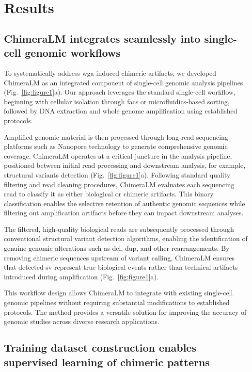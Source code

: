 \documentclass[pdflatex,sn-nature]{sn-jnl}%
\theoremstyle{thmstyleone}%
\theoremstyle{thmstyletwo}%
\theoremstyle{thmstylethree}%
\begin{document}
\section*{Results}\label{sec:results}

\subsection*{ChimeraLM integrates seamlessly into single-cell genomic workflows}

To systematically address \gls{wga}-induced chimeric artifacts, we developed ChimeraLM as an integrated component of single-cell genomic analysis pipelines (Fig.~\ref{fig:figure1}a).
Our approach leverages the standard single-cell workflow, beginning with cellular isolation through \gls{facs} or microfluidics-based sorting, followed by DNA extraction and whole genome amplification using established protocols.

Amplified genomic material is then processed through long-read sequencing platforms such as Nanopore technology to generate comprehensive genomic coverage.
ChimeraLM operates at a critical juncture in the analysis pipeline, positioned between initial read processing and downstream analysis, for example, structural variants detection (Fig.~\ref{fig:figure1}a).
Following standard quality filtering and read cleaning procedures, ChimeraLM evaluates each sequencing read to classify it as either biological or chimeric artifacts.
This binary classification enables the selective retention of authentic genomic sequences while filtering out amplification artifacts before they can impact downstream analyses.

The filtered, high-quality biological reads are subsequently processed through conventional structural variant detection algorithms, enabling the identification of genuine genomic alterations such as \gls{del}, \gls{dup}, and other rearrangements.
By removing chimeric sequences upstream of variant calling, ChimeraLM ensures that detected \gls{sv} represent true biological events rather than technical artifacts introduced during amplification (Fig.~\ref{fig:figure1}a).

This workflow design allows ChimeraLM to integrate with existing single-cell genomic pipelines without requiring substantial modifications to established protocols.
The method provides a versatile solution for improving the accuracy of genomic studies across diverse research applications.

\subsection*{Training dataset construction enables supervised learning of chimeric patterns}
\end{document}

